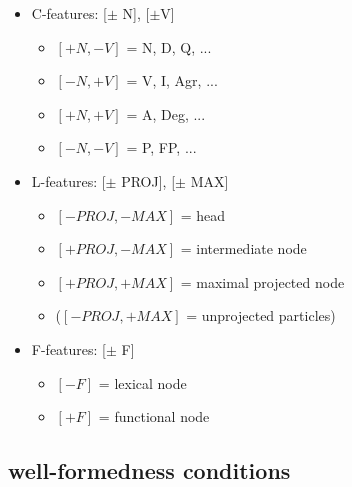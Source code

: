 \documentclass{article}
\begin{document}
\begin{example}
\begin{itemize}
\item C-features: [$\pm$ N], [$\pm$V]
\begin{itemize}
\item $[+N, -V]$ = N, D, Q, ...
\item $[-N, +V]$ = V, I, Agr, ...
\item $[+N, +V]$ = A, Deg, ...
\item $[-N, -V]$ = P, FP, ...
\end{itemize}
\item L-features: [$\pm$ PROJ], [$\pm$ MAX]
\begin{itemize}
\item $[-PROJ, -MAX]$ = head
\item $[+PROJ, -MAX]$ = intermediate node
\item $[+PROJ, +MAX]$ = maximal projected node
\item ($[-PROJ, +MAX]$ = unprojected particles)
\end{itemize}
\item F-features: [$\pm$ F]
\begin{itemize}
\item $[-F]$ = lexical node
\item $[+F]$ = functional node
\end{itemize}
\end{itemize}
\end{example}


\subsection{well-formedness conditions}
\end{document}
